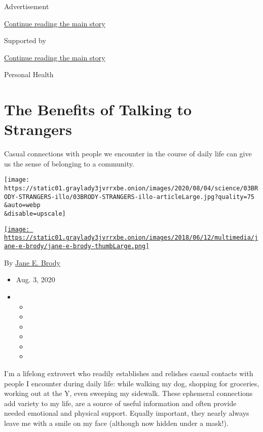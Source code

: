 Advertisement

\protect\hyperlink{after-top}{Continue reading the main story}

Supported by

\protect\hyperlink{after-sponsor}{Continue reading the main story}

Personal Health

\hypertarget{the-benefits-of-talking-to-strangers}{%
\section{The Benefits of Talking to
Strangers}\label{the-benefits-of-talking-to-strangers}}

Casual connections with people we encounter in the course of daily life
can give us the sense of belonging to a community.

\texttt{[image: https://static01.graylady3jvrrxbe.onion/images/2020/08/04/science/03BRODY-STRANGERS-illo/03BRODY-STRANGERS-illo-articleLarge.jpg?quality=75\\\&auto=webp\\\&disable=upscale]}

\href{https://www.nytimes3xbfgragh.onion/by/jane-e-brody}{\texttt{[image: https://static01.graylady3jvrrxbe.onion/images/2018/06/12/multimedia/jane-e-brody/jane-e-brody-thumbLarge.png]}}

By \href{https://www.nytimes3xbfgragh.onion/by/jane-e-brody}{Jane E.
Brody}

\begin{itemize}
\item
  Aug. 3, 2020
\item
  \begin{itemize}
  \item
  \item
  \item
  \item
  \item
  \item
  \end{itemize}
\end{itemize}

I'm a lifelong extrovert who readily establishes and relishes casual
contacts with people I encounter during daily life: while walking my
dog, shopping for groceries, working out at the Y, even sweeping my
sidewalk. These ephemeral connections add variety to my life, are a
source of useful information and often provide needed emotional and
physical support. Equally important, they nearly always leave me with a
smile on my face (although now hidden under a mask!).

